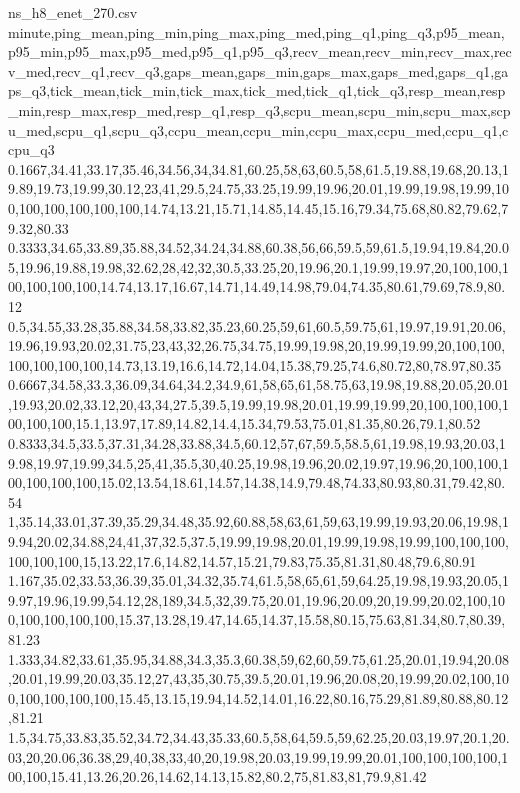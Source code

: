 \begin{filecontents*}[overwrite]{ns_h8_enet_270.csv}
minute,ping_mean,ping_min,ping_max,ping_med,ping_q1,ping_q3,p95_mean,p95_min,p95_max,p95_med,p95_q1,p95_q3,recv_mean,recv_min,recv_max,recv_med,recv_q1,recv_q3,gaps_mean,gaps_min,gaps_max,gaps_med,gaps_q1,gaps_q3,tick_mean,tick_min,tick_max,tick_med,tick_q1,tick_q3,resp_mean,resp_min,resp_max,resp_med,resp_q1,resp_q3,scpu_mean,scpu_min,scpu_max,scpu_med,scpu_q1,scpu_q3,ccpu_mean,ccpu_min,ccpu_max,ccpu_med,ccpu_q1,ccpu_q3
0.1667,34.41,33.17,35.46,34.56,34,34.81,60.25,58,63,60.5,58,61.5,19.88,19.68,20.13,19.89,19.73,19.99,30.12,23,41,29.5,24.75,33.25,19.99,19.96,20.01,19.99,19.98,19.99,100,100,100,100,100,100,14.74,13.21,15.71,14.85,14.45,15.16,79.34,75.68,80.82,79.62,79.32,80.33
0.3333,34.65,33.89,35.88,34.52,34.24,34.88,60.38,56,66,59.5,59,61.5,19.94,19.84,20.05,19.96,19.88,19.98,32.62,28,42,32,30.5,33.25,20,19.96,20.1,19.99,19.97,20,100,100,100,100,100,100,14.74,13.17,16.67,14.71,14.49,14.98,79.04,74.35,80.61,79.69,78.9,80.12
0.5,34.55,33.28,35.88,34.58,33.82,35.23,60.25,59,61,60.5,59.75,61,19.97,19.91,20.06,19.96,19.93,20.02,31.75,23,43,32,26.75,34.75,19.99,19.98,20,19.99,19.99,20,100,100,100,100,100,100,14.73,13.19,16.6,14.72,14.04,15.38,79.25,74.6,80.72,80,78.97,80.35
0.6667,34.58,33.3,36.09,34.64,34.2,34.9,61,58,65,61,58.75,63,19.98,19.88,20.05,20.01,19.93,20.02,33.12,20,43,34,27.5,39.5,19.99,19.98,20.01,19.99,19.99,20,100,100,100,100,100,100,15.1,13.97,17.89,14.82,14.4,15.34,79.53,75.01,81.35,80.26,79.1,80.52
0.8333,34.5,33.5,37.31,34.28,33.88,34.5,60.12,57,67,59.5,58.5,61,19.98,19.93,20.03,19.98,19.97,19.99,34.5,25,41,35.5,30,40.25,19.98,19.96,20.02,19.97,19.96,20,100,100,100,100,100,100,15.02,13.54,18.61,14.57,14.38,14.9,79.48,74.33,80.93,80.31,79.42,80.54
1,35.14,33.01,37.39,35.29,34.48,35.92,60.88,58,63,61,59,63,19.99,19.93,20.06,19.98,19.94,20.02,34.88,24,41,37,32.5,37.5,19.99,19.98,20.01,19.99,19.98,19.99,100,100,100,100,100,100,15,13.22,17.6,14.82,14.57,15.21,79.83,75.35,81.31,80.48,79.6,80.91
1.167,35.02,33.53,36.39,35.01,34.32,35.74,61.5,58,65,61,59,64.25,19.98,19.93,20.05,19.97,19.96,19.99,54.12,28,189,34.5,32,39.75,20.01,19.96,20.09,20,19.99,20.02,100,100,100,100,100,100,15.37,13.28,19.47,14.65,14.37,15.58,80.15,75.63,81.34,80.7,80.39,81.23
1.333,34.82,33.61,35.95,34.88,34.3,35.3,60.38,59,62,60,59.75,61.25,20.01,19.94,20.08,20.01,19.99,20.03,35.12,27,43,35,30.75,39.5,20.01,19.96,20.08,20,19.99,20.02,100,100,100,100,100,100,15.45,13.15,19.94,14.52,14.01,16.22,80.16,75.29,81.89,80.88,80.12,81.21
1.5,34.75,33.83,35.52,34.72,34.43,35.33,60.5,58,64,59.5,59,62.25,20.03,19.97,20.1,20.03,20,20.06,36.38,29,40,38,33,40,20,19.98,20.03,19.99,19.99,20.01,100,100,100,100,100,100,15.41,13.26,20.26,14.62,14.13,15.82,80.2,75,81.83,81,79.9,81.42

\end{filecontents*}
